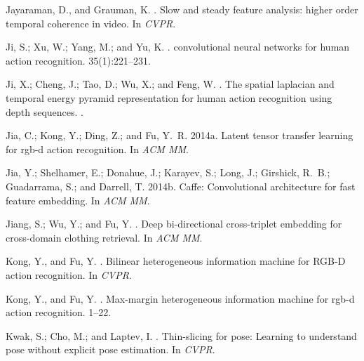 \documentclass[letterpaper]{article} %
\begin{document}
\begin{thebibliography}{}
Jayaraman, D., and Grauman, K.
.
\newblock Slow and steady feature analysis: higher order temporal coherence in
  video.
\newblock In {\em CVPR}.

Ji, S.; Xu, W.; Yang, M.; and Yu, K.
.
 convolutional neural networks for human action recognition.
 35(1):221--231.

Ji, X.; Cheng, J.; Tao, D.; Wu, X.; and Feng, W.
.
\newblock The spatial laplacian and temporal energy pyramid representation for
  human action recognition using depth sequences.
.

Jia, C.; Kong, Y.; Ding, Z.; and Fu, Y.~R.
\newblock 2014a.
\newblock Latent tensor transfer learning for rgb-d action recognition.
\newblock In {\em ACM MM}.

Jia, Y.; Shelhamer, E.; Donahue, J.; Karayev, S.; Long, J.; Girshick, R.~B.;
  Guadarrama, S.; and Darrell, T.
\newblock 2014b.
\newblock Caffe: Convolutional architecture for fast feature embedding.
\newblock In {\em ACM MM}.

Jiang, S.; Wu, Y.; and Fu, Y.
.
\newblock Deep bi-directional cross-triplet embedding for cross-domain clothing
  retrieval.
\newblock In {\em ACM MM}.

Kong, Y., and Fu, Y.
.
\newblock Bilinear heterogeneous information machine for {RGB-D} action
  recognition.
\newblock In {\em CVPR}.

Kong, Y., and Fu, Y.
.
\newblock Max-margin heterogeneous information machine for rgb-d action
  recognition.
  1--22.

Kwak, S.; Cho, M.; and Laptev, I.
.
\newblock Thin-slicing for pose: Learning to understand pose without explicit
  pose estimation.
\newblock In {\em CVPR}.


\end{thebibliography}
\end{document}
